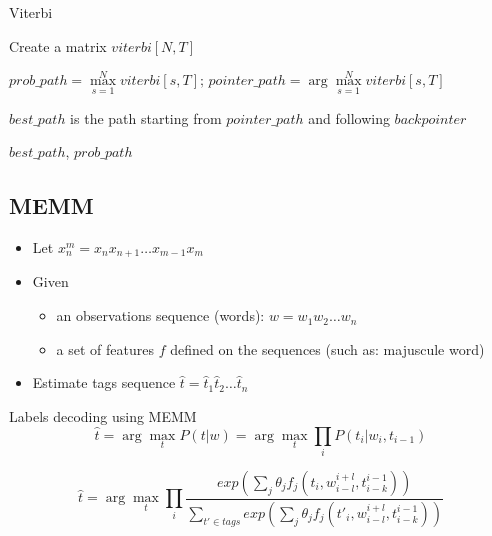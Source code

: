 \documentclass{KBook}
\begin{document}
	\begin{block}{Viterbi}
		\scriptsize
		\begin{algorithm}[H]
			
			Create a matrix $viterbi[N, T]$\;
			
			
			
			$prob\_path = \max\limits_{s=1}^N viterbi[s, T];\, pointer\_path = \arg\max\limits_{s=1}^N viterbi[s, T]$\;
			
			$best\_path$ is the path starting from $pointer\_path$ and following $backpointer$
			
			\Return $best\_path$, $prob\_path$\;
			
		\end{algorithm}
	\end{block}
	

\subsection{MEMM}

	
	\begin{itemize}
		\item Let $x_{n}^{m} = x_n x_{n+1} \ldots x_{m-1} x_m$
		\item Given 
		\begin{itemize}
			\item an observations sequence (words): $w = w_1 w_2 \ldots w_n$
			\item a set of features $f$ defined on the sequences (such as: majuscule word)
		\end{itemize}
		\item Estimate tags sequence $\hat{t} = \hat{t}_1 \hat{t}_2 \ldots \hat{t}_n$
	\end{itemize}
	
	\begin{block}{Labels decoding using MEMM}
		\[
		\hat{t} = \arg\max\limits_t P(t | w) = \arg\max\limits_t \prod\limits_{i}  P(t_i | w_i, t_{i-1})
		\]
		
		\[
		\hat{t} = \arg\max\limits_t \prod\limits_{i}  
		\frac{exp\left(\sum_j \theta_j f_j(t_i, w_{i-l}^{i+l}, t_{i-k}^{i-1})\right)}%
		{\sum_{t' \in tags} exp\left(\sum_j \theta_j f_j(t'_i, w_{i-l}^{i+l}, t_{i-k}^{i-1})\right)}
		\]
	\end{block}
	
\end{document}
